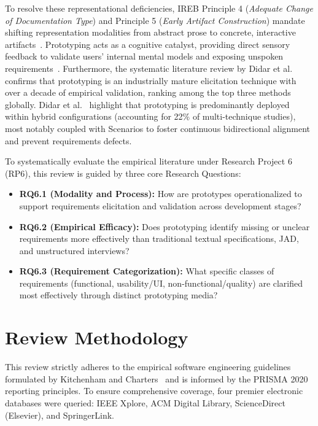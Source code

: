 \documentclass[conference]{IEEEtran}
\begin{document}
To resolve these representational deficiencies, IREB Principle 4 (\textit{Adequate Change of Documentation Type}) and Principle 5 (\textit{Early Artifact Construction}) mandate shifting representation modalities from abstract prose to concrete, interactive artifacts~\cite{bbau_re_book}. Prototyping acts as a cognitive catalyst, providing direct sensory feedback to validate users' internal mental models and exposing unspoken requirements~\cite{bbau_re_book}. Furthermore, the systematic literature review by Didar et al.~\cite{didar2018systematic} confirms that prototyping is an industrially mature elicitation technique with over a decade of empirical validation, ranking among the top three methods globally. Didar et al.~\cite{didar2018systematic} highlight that prototyping is predominantly deployed within hybrid configurations (accounting for 22\% of multi-technique studies), most notably coupled with Scenarios to foster continuous bidirectional alignment and prevent requirements defects.

To systematically evaluate the empirical literature under Research Project 6 (RP6), this review is guided by three core Research Questions:
\begin{itemize}
    \item \textbf{RQ6.1 (Modality and Process):} How are prototypes operationalized to support requirements elicitation and validation across development stages?
    \item \textbf{RQ6.2 (Empirical Efficacy):} Does prototyping identify missing or unclear requirements more effectively than traditional textual specifications, JAD, and unstructured interviews?
    \item \textbf{RQ6.3 (Requirement Categorization):} What specific classes of requirements (functional, usability/UI, non-functional/quality) are clarified most effectively through distinct prototyping media?
\end{itemize}

\section{Review Methodology}
This review strictly adheres to the empirical software engineering guidelines formulated by Kitchenham and Charters~\cite{kitchenham2007guidelines} and is informed by the PRISMA 2020 reporting principles. To ensure comprehensive coverage, four premier electronic databases were queried: IEEE Xplore, ACM Digital Library, ScienceDirect (Elsevier), and SpringerLink. 
\end{document}
